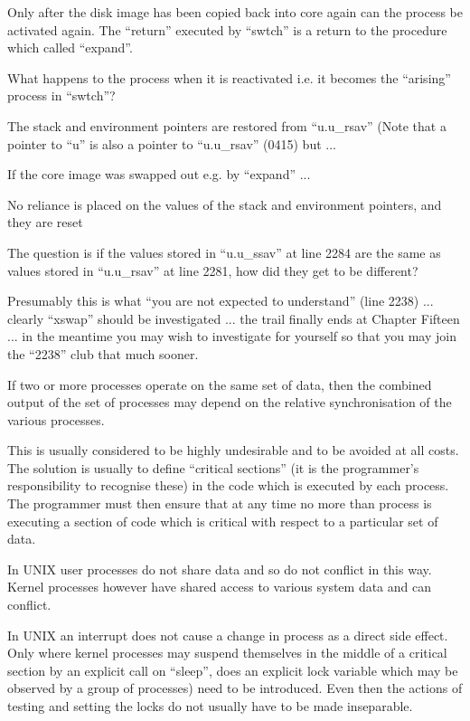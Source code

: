 Only after the disk image has
been copied back into core again
can the process be activated
again. The ``return'' executed by
``swtch'' is a return to the procedure which called ``expand''.


What happens to the process when it is
reactivated i.e. it becomes the ``arising'' process in ``swtch''?

\bd
\item[2228:] The stack and environment
 pointers are restored from
 ``u.u\_rsav'' (Note that a pointer
 to ``u'' is also a pointer to
 ``u.u\_rsav'' (0415) but ...

\item[2240:] If the core image was swapped
 out e.g. by ``expand'' ...

\item[2242:] No reliance is placed on the
 values of the stack and environment pointers, and they are reset
\ed


The question is if the values stored
in ``u.u\_ssav'' at line 2284 are the same
as values stored in ``u.u\_rsav'' at line
2281, how did they get to be different?


Presumably this is what ``you are not
expected to understand'' (line 2238) ...
clearly ``xswap'' should be investigated
... the trail finally ends at Chapter
Fifteen ... in the meantime you may
wish to investigate for yourself so
that you may join the ``2238'' club that
much sooner.


If two or more processes operate on the
same set of data, then the combined
output of the set of processes may
depend on the relative synchronisation
of the various processes.

This is usually considered to be highly
undesirable and to be avoided at all
costs. The solution is usually to
define ``critical sections'' (it is the
programmer's responsibility to recognise these) in the code which is executed by each process. The programmer
must then ensure that at any time no
more than process is executing a
section of code which is critical with
respect to a particular set of data.

In UNIX user processes do not share
data and so do not conflict in this
way. Kernel processes however have
shared access to various system data
and can conflict.

In UNIX an interrupt does not cause a
change in process as a direct side
effect. Only where kernel processes
may suspend themselves in the middle of
a critical section by an explicit call
on ``sleep'', does an explicit lock variable which may be observed by a group
of processes) need to be introduced.
Even then the actions of testing and
setting the locks do not usually have
to be made inseparable.


